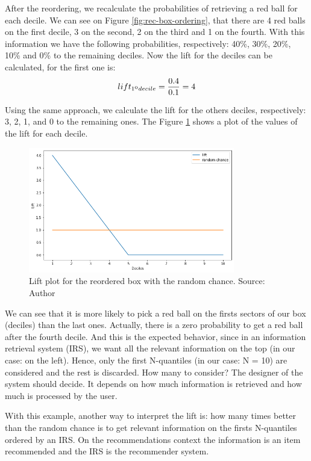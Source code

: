 After the reordering, we recalculate the probabilities of retrieving a red ball for each decile. We can see on Figure \ref{fig:rec-box-ordering}, that there are 4 red balls on the first decile, 3 on the second, 2 on the third and 1 on the fourth. With this information we have the following probabilities, respectively: 40\%, 30\%, 20\%, 10\% and 0\% to the remaining deciles. Now the lift for the deciles can be calculated, for the first one is:
\begin{equation}
	lift_{1\textsuperscript{o} decile} = \frac{0.4}{0.1} = 4
\end{equation}

Using the same approach, we calculate the lift for the others deciles, respectively: 3, 2, 1, and 0 to the remaining ones. The Figure \ref{fig:lift-plot} shows a plot of the values of the lift for each decile.

\begin{figure}[h]
   \centering
   \includegraphics[width=9cm]{fig/ch2-lift-plot.png}
   \caption{Lift plot for the reordered box with the random chance. Source: Author}
   \label{fig:lift-plot}
\end{figure}

We can see that it is more likely to pick a red ball on the firsts sectors of our box (deciles) than the last ones. Actually, there is a zero probability to get a red ball after the fourth decile. And this is the expected behavior, since in an information retrieval system (IRS), we want all the relevant information on the top (in our case: on the left). Hence, only the first N-quantiles (in our case: N = 10) are considered and the rest is discarded. How many to consider? The designer of the system should decide. It depends on how much information is retrieved and how much is processed by the user.

With this example, another way to interpret the lift is:  how many times better than the random chance is to get relevant information on the firsts N-quantiles ordered by an IRS. On the recommendations context the information is an item recommended and the IRS is the recommender system.

